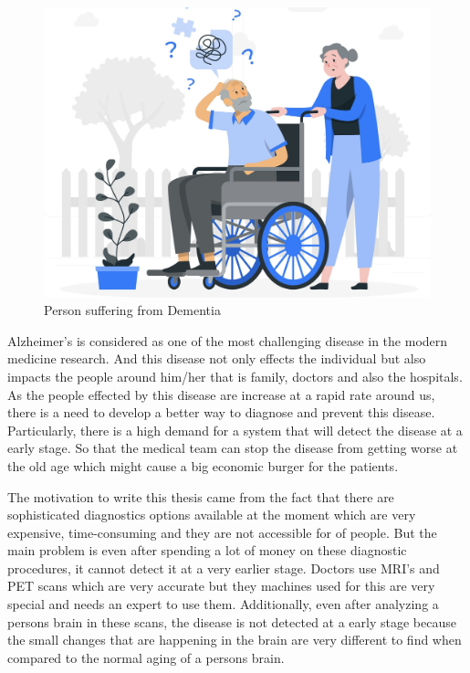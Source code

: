\documentclass[12pt,onecolumn]{report}
\begin{document}
\begin{figure}[h!]
    \centering
    \includegraphics[width=0.8\columnwidth]{figures/fig2.jpeg}  %
    \caption{Person suffering from Dementia} %
    \label{fig:alzheimers_patient} %
\end{figure}

Alzheimer's is considered as one of the most challenging disease in the modern medicine research. And this disease not only effects the individual but also impacts the people around him/her that is family, doctors and also the hospitals. As the people effected by this disease are increase at a rapid rate around us, there is a need to develop a better way to diagnose and prevent this disease. Particularly, there is a high demand for a system that will detect the disease at a early stage. So that the medical team can stop the disease from getting worse at the old age which might cause a big economic burger for the patients.

The motivation to write this thesis came from the fact that there are sophisticated diagnostics options available at the moment which are very expensive, time-consuming and they are not accessible for of people. But the main problem is even after spending a lot of money on these diagnostic procedures, it cannot detect it at a very earlier stage. Doctors use MRI's and PET scans which are very accurate but they machines used for this are very special and needs an expert to use them. Additionally, even after analyzing a persons brain in these scans, the disease is not detected at a early stage because the small changes that are happening in the brain are very different to find when compared to the normal aging of a persons brain. 
\end{document}
